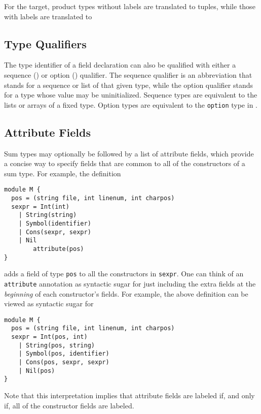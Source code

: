 For the \sml{} target, product types without labels are translated to tuples, while those with
labels are translated to 
\subsection{Type Qualifiers}

The type identifier of a field declaration can also be qualified with either
a sequence (\lit{*}) or option () qualifier.
The sequence qualifier
is an abbreviation that stands for a sequence or list of that given type,
while the option qualifier stands for a type whose value may be
uninitialized.
Sequence types are equivalent to the lists or arrays of a
fixed type.
Option types are equivalent to the \lstinline[language=ASDL]!option!
type in \sml{}.

\subsection{Attribute Fields}
Sum types may optionally be followed by a list of attribute fields, which
provide a concise way to specify fields that are common to all of the constructors
of a sum type.
For example, the definition
%
\begin{code}\begin{lstlisting}[language=ASDL]
module M {
  pos = (string file, int linenum, int charpos)
  sexpr = Int(int)
	| String(string)
	| Symbol(identifier)
	| Cons(sexpr, sexpr)
	| Nil
        attribute(pos)
}
\end{lstlisting}\end{code}%
adds a field of type \lstinline[language=ASDL]!pos! to all the constructors
in \lstinline[language=ASDL]!sexpr!.
One can think of an \lstinline!attribute! annotation as syntactic sugar for just including
the extra fields at the \emph{beginning} of each constructor's fields.
For example, the above definition can be viewed as syntactic sugar for
%
\begin{code}\begin{lstlisting}[language=ASDL]
module M {
  pos = (string file, int linenum, int charpos)
  sexpr = Int(pos, int)
	| String(pos, string)
	| Symbol(pos, identifier)
	| Cons(pos, sexpr, sexpr)
	| Nil(pos)
}
\end{lstlisting}\end{code}%
Note that this interpretation implies that attribute fields are labeled if, and only if, all
of the constructor fields are labeled.

